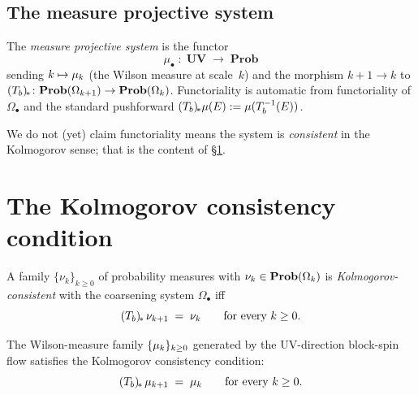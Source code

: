 \subsection{The measure projective system}
\label{subsec:measure-system}

\begin{definition}
\label{def:measure-system}
The \emph{measure projective system} is the functor
\begin{equation*}
  \mu_\bullet \;\colon\; \mathbf{UV} \;\longrightarrow\; \mathbf{Prob}
\end{equation*}
sending $k \mapsto \mu_k$ (the Wilson measure at scale~$k$) and
the morphism $k+1 \to k$ to $(T_b)_{\!*} \colon \mathbf{Prob}(\Omega_{k+1}) \to
\mathbf{Prob}(\Omega_k)$.  Functoriality is automatic from functoriality
of $\Omega_\bullet$ and the standard pushforward
$(T_b)_{\!*} \mu(E) := \mu(T_b^{-1}(E))$.
\end{definition}

We do not (yet) claim functoriality means the system is
\emph{consistent} in the Kolmogorov sense; that is the content of
\S\ref{sec:consistency}.

\section{The Kolmogorov consistency condition}
\label{sec:consistency}

\begin{definition}[Consistency]
\label{def:consistency}
A family $\{\nu_k\}_{k \ge 0}$ of probability measures with
$\nu_k \in \mathbf{Prob}(\Omega_k)$ is \emph{Kolmogorov-consistent} with
the coarsening system $\Omega_\bullet$ iff
\begin{equation*}
  (T_b)_{\!*} \, \nu_{k+1} \;=\; \nu_k \qquad \text{for every } k \ge 0.
\end{equation*}
\end{definition}

\begin{theorem}
\label{thm:wilson-consistency}
The Wilson-measure family $\{\mu_k\}_{k \ge 0}$ generated by the
UV-direction block-spin flow satisfies the Kolmogorov consistency
condition:
\begin{equation*}
  (T_b)_{\!*} \, \mu_{k+1} \;=\; \mu_k \qquad \text{for every } k \ge 0.
\end{equation*}
\end{theorem}

